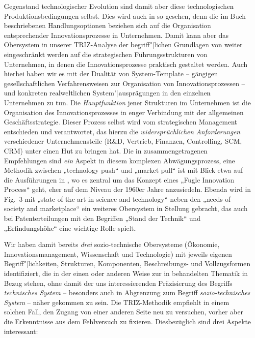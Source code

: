 \documentclass[11pt,a4paper]{article}
\begin{document}
Gegenstand technologischer Evolution sind damit aber diese technologischen
Produktionsbedingungen selbst. Dies wird auch in \cite{TESE2018} so gesehen,
denn die im Buch beschriebenen Handlungsoptionen beziehen sich auf die
Organisation entsprechender Innovationsprozesse in Unternehmen. Damit kann
aber das Obersystem in unserer TRIZ-Analyse der begriff"|lichen Grundlagen von
\cite{TESE2018} weiter eingeschränkt werden auf die strategischen
Führungsstrukturen von Unternehmen, in denen die Innovationsprozesse praktisch
gestaltet werden. Auch hierbei haben wir es mit der Dualität von
System-Template -- gängigen gesellschaftlichen Verfahrensweisen zur
Organisation von Innovationsprozessen -- und konkreten realweltlichen
System"|ausprägungen in den einzelnen Unternehmen zu tun. Die
\emph{Hauptfunktion} jener Strukturen im Unternehmen ist die Organisation des
Innovationsprozesses in enger Verbindung mit der allgemeinen
Geschäftsstrategie.  Dieser Prozess selbst wird vom strategischen Management
entschieden und verantwortet, das hierzu die \emph{widersprüchlichen
  Anforderungen} verschiedener Unternehmensteile (R\&D, Vertrieb, Finanzen,
Controlling, SCM, CRM) unter einen Hut zu bringen hat. Die in \cite{TESE2018}
zusammengetragenen Empfehlungen sind \emph{ein} Aspekt in diesem komplexen
Abwägungsprozess, eine Methodik zwischen „technology push“ und „market pull“
ist mit Blick etwa auf die Ausführungen in \cite{Preez2006}, wo es zentral um
das Konzept eines „Fugle Innovation Process“ geht, eher auf dem Niveau der
1960er Jahre anzusiedeln. Ebenda wird in Fig.~3 mit „state of the art in
science and technology“ neben den „needs of society and marketplace“ ein
weiteres Obersystem in Stellung gebracht, das auch  bei Patenterteilungen mit
den Begriffen „Stand der Technik“ und „Erfindungshöhe“ eine wichtige Rolle
spielt.

Wir haben damit bereits \emph{drei} sozio-technische Obersysteme (Ökonomie,
Innovationsmanagement, Wissenschaft und Technologie) mit jeweils eigenen
Begriff"|lichkeiten, Strukturen, Komponenten, Beschreibungs- und
Vollzugsformen identifiziert, die in der einen oder anderen Weise zur in
\cite{TESE2018} behandelten Thematik in Bezug stehen, ohne damit der uns
interessierenden Präzisierung des Begriffs \emph{technisches System} --
besonders auch in Abgrenzung zum Begriff \emph{sozio-technisches System} --
näher gekommen zu sein. Die TRIZ-Methodik empfiehlt in einem solchen Fall, den
Zugang von einer anderen Seite neu zu versuchen, vorher aber die Erkenntnisse
aus dem Fehlversuch zu fixieren.  Diesbezüglich sind drei Aspekte interessant:
\end{document}
